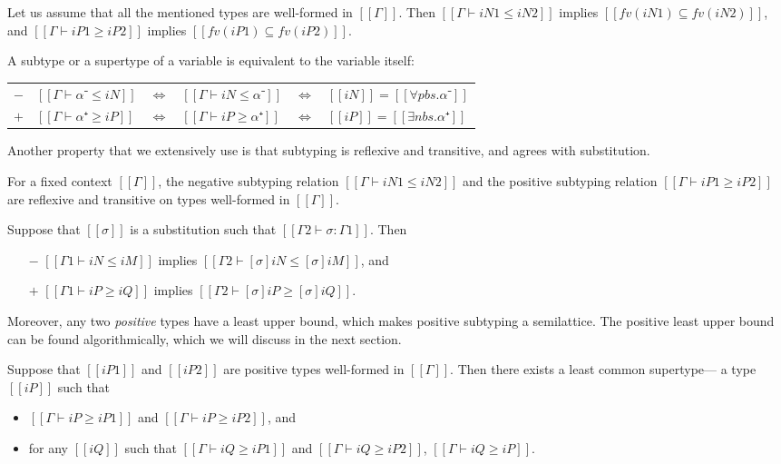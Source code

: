 \begin{property}
  \label{prop:subtyping-preserves-fv}
  Let us assume that all the mentioned types are well-formed in $[[Γ]]$. Then
  $[[Γ ⊢ iN1 ≤ iN2]]$ implies $[[fv(iN1) ⊆ fv(iN2)]]$,
  and $[[Γ ⊢ iP1 ≥ iP2]]$ implies $[[fv(iP1) ⊆ fv(iP2)]]$.
\end{property}

\begin{property}
  \label{prop:var-no-subtypes}
  A subtype or a supertype of a variable is equivalent to the variable itself:

  \begin{tabular}{@{}llclcl@{}}
    $-$ & $[[Γ ⊢ α⁻ ≤ iN]]$ & $\iff$ & $[[Γ ⊢ iN ≤ α⁻]]$ & $\iff$ & $[[iN]] = [[∀pbs.α⁻]]$ \\
    $+$ & $[[Γ ⊢ α⁺ ≥ iP]]$ & $\iff$ & $[[Γ ⊢ iP ≥ α⁺]]$ & $\iff$ & $[[iP]] = [[∃nbs.α⁺]]$
  \end{tabular}
\end{property}

Another property that we extensively use is that subtyping is reflexive and transitive,
and agrees with substitution.

\begin{property}
  For a fixed context $[[Γ]]$, the negative subtyping relation 
  $[[Γ ⊢ iN1 ≤ iN2]]$ and the positive subtyping relation 
  $[[Γ ⊢ iP1 ≥ iP2]]$
  are reflexive and transitive on types well-formed in $[[Γ]]$.
\end{property}

\begin{property}
  Suppose that  $[[σ]]$ is a substitution such that $[[Γ2 ⊢ σ : Γ1]]$. 
  Then
  \begin{enumerate}
    \item [$-$] $[[Γ1 ⊢ iN ≤ iM]]$ implies $[[Γ2 ⊢ [σ]iN ≤ [σ]iM]]$, and
    \item [$+$] $[[Γ1 ⊢ iP ≥ iQ]]$ implies $[[Γ2 ⊢ [σ]iP ≥ [σ]iQ]]$.
  \end{enumerate}
\end{property}

Moreover, any two \emph{positive} types have a least upper bound, which makes
positive subtyping a semilattice. The positive least upper bound can be found
algorithmically, which we will discuss in the next section.

\begin{property}
  Suppose that $[[iP1]]$ and $[[iP2]]$ are positive types
  well-formed in $[[Γ]]$.
  Then there exists a least common supertype--- a type $[[iP]]$ such that
  \begin{itemize}
    \item $[[Γ ⊢ iP ≥ iP1]]$ and $[[Γ ⊢ iP ≥ iP2]]$, and 
    \item for any $[[iQ]]$ such that $[[Γ ⊢ iQ ≥ iP1]]$ and $[[Γ ⊢ iQ ≥ iP2]]$,
      $[[Γ ⊢ iQ ≥ iP]]$.
  \end{itemize}
\end{property}

